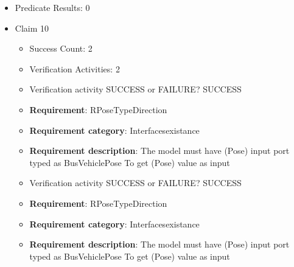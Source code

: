 \documentclass{article}
\begin{document}
\begin{itemize}
\begin{itemize}
						\item \textbf{Requirement}: RLateral\_VelocityTypeDirection 
						\item \textbf{Requirement category}: Interfacesexistance 
						\item \textbf{Requirement description}: The model must have (lateral velocity) input port typed as double To send (lateral velocity) value as output
					
					\item Verification activity SUCCESS or FAILURE? SUCCESS
		
						\item \textbf{Requirement}: RLateral\_VelocityTypeDirection 
						\item \textbf{Requirement category}: Interfacesexistance 
						\item \textbf{Requirement description}: The model must have (lateral velocity) input port typed as double To send (lateral velocity) value as output
					
				\end{itemize}
				
									    
				\item Predicate Results: 0

  				  \item Claim 10
				\begin{itemize}
			    	\item Success Count: 2 
			    	\item Verification Activities: 2
					\item Verification activity SUCCESS or FAILURE? SUCCESS
		
						\item \textbf{Requirement}: RPoseTypeDirection 
						\item \textbf{Requirement category}: Interfacesexistance 
						\item \textbf{Requirement description}: The model must have (Pose) input port typed as BusVehiclePose To get (Pose) value as input
					
					\item Verification activity SUCCESS or FAILURE? SUCCESS
		
						\item \textbf{Requirement}: RPoseTypeDirection 
						\item \textbf{Requirement category}: Interfacesexistance 
						\item \textbf{Requirement description}: The model must have (Pose) input port typed as BusVehiclePose To get (Pose) value as input
					

\end{itemize}
\end{itemize}
\end{document}
